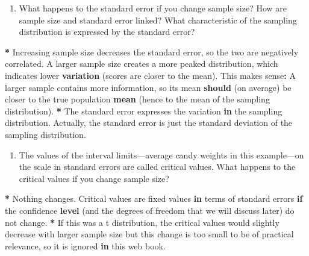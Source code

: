\documentclass[a4paper]{book}
\newenvironment{Shaded}{\begin{snugshade}}{\end{snugshade}}
\newcommand{\KeywordTok}[1]{\textcolor[rgb]{0,0,0}{\textbf{#1}}}
\newcommand{\StringTok}[1]{\textcolor[rgb]{0.00,0.00,0.00}{#1}}
\newcommand{\ControlFlowTok}[1]{\textcolor[rgb]{0.00,0.00,0.00}{\textbf{#1}}}
\newcommand{\OperatorTok}[1]{\textcolor[rgb]{0.00,0.00,0.00}{\textbf{#1}}}
\newcommand{\NormalTok}[1]{#1}
\providecommand{\tightlist}{%
  \setlength{\itemsep}{0pt}\setlength{\parskip}{0pt}}
\theoremstyle{definition}
\theoremstyle{definition}
\theoremstyle{definition}
\theoremstyle{remark}
\begin{document}
\begin{enumerate}
\def\labelenumi{\arabic{enumi}.}
\setcounter{enumi}{4}
\tightlist
\item
  What happens to the standard error if you change sample size? How are
  sample size and standard error linked? What characteristic of the
  sampling distribution is expressed by the standard error?
\end{enumerate}

\begin{Shaded}
\begin{Highlighting}[]
\OperatorTok{*}\StringTok{ }\NormalTok{Increasing sample size decreases the standard error, so the two are}
\NormalTok{negatively correlated. A larger sample size creates a more peaked}
\NormalTok{distribution, which indicates lower }\KeywordTok{variation}\NormalTok{ (scores are closer to the mean).}
\NormalTok{This makes sense}\OperatorTok{:}\StringTok{ }\NormalTok{A larger sample contains more information, so its mean}
\KeywordTok{should}\NormalTok{ (on average) be closer to the true population }\KeywordTok{mean}\NormalTok{ (hence to the mean}
\NormalTok{of the sampling distribution).}
\OperatorTok{*}\StringTok{ }\NormalTok{The standard error expresses the variation }\ControlFlowTok{in}\NormalTok{ the sampling distribution.}
\NormalTok{Actually, the standard error is just the standard deviation of the sampling}
\NormalTok{distribution.}
\end{Highlighting}
\end{Shaded}

\begin{enumerate}
\def\labelenumi{\arabic{enumi}.}
\setcounter{enumi}{5}
\tightlist
\item
  The values of the interval limits---average candy weights in this
  example---on the scale in standard errors are called critical values.
  What happens to the critical values if you change sample size?
\end{enumerate}

\begin{Shaded}
\begin{Highlighting}[]
\OperatorTok{*}\StringTok{ }\NormalTok{Nothing changes. Critical values are fixed values }\ControlFlowTok{in}\NormalTok{ terms of standard}
\NormalTok{errors }\ControlFlowTok{if}\NormalTok{ the confidence }\KeywordTok{level}\NormalTok{ (and the degrees of freedom that we will}
\NormalTok{discuss later) do not change.}
\OperatorTok{*}\StringTok{ }\NormalTok{If this was a t distribution, the critical values would slightly decrease }
\NormalTok{with larger sample size but this change is too small to be of practical }
\NormalTok{relevance, so it is ignored }\ControlFlowTok{in}\NormalTok{ this web book.}
\end{Highlighting}
\end{Shaded}
\end{document}
